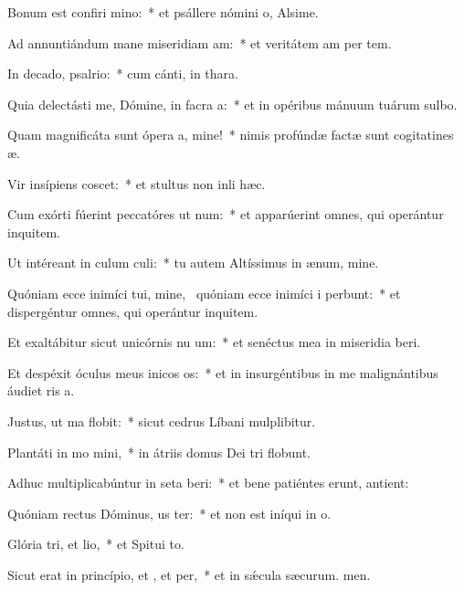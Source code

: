 \item Bonum est confiri mino:~* et psállere nómini o, Alsime.
\item Ad annuntiándum mane miseridiam am:~* et veritátem am per tem.
\item In decado, psalrio:~* cum cánti, in thara.
\item Quia delectásti me, Dómine, in facra a:~* et in opéribus mánuum tuárum sulbo.
\item Quam magnificáta sunt ópera a, mine!~* nimis profúndæ factæ sunt cogitatines æ.
\item Vir insípiens  coscet:~* et stultus non inli hæc.
\item Cum exórti fúerint peccatóres ut num:~* et apparúerint omnes, qui operántur inquitem.
\item Ut intéreant in culum culi:~* tu autem Altíssimus in ænum, mine.
\item Quóniam ecce inimíci tui, mine,~\pscross{} quóniam ecce inimíci i perbunt:~* et dispergéntur omnes, qui operántur inquitem.
\item Et exaltábitur sicut unicórnis nu um:~* et senéctus mea in miseridia beri.
\item Et despéxit óculus meus inicos os:~* et in insurgéntibus in me malignántibus áudiet ris a.
\item Justus, ut ma flobit:~* sicut cedrus Líbani mulplibitur.
\item Plantáti in mo mini,~* in átriis domus Dei tri flobunt.
\item Adhuc multiplicabúntur in seta beri:~* et bene patiéntes erunt,  antient:
\item Quóniam rectus Dóminus, us ter:~* et non est iníqui in o.
\item Glória tri, et lio,~* et Spitui to.
\item Sicut erat in princípio, et , et per,~* et in sǽcula sæcurum. men.
